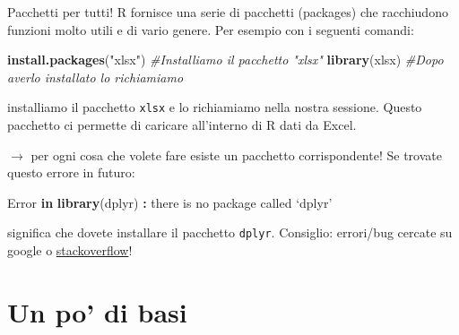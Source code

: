 \documentclass[
  ignorenonframetext,
]{beamer}
\newenvironment{Shaded}{\begin{snugshade}}{\end{snugshade}}
\newcommand{\CommentTok}[1]{\textcolor[rgb]{0.56,0.35,0.01}{\textit{#1}}}
\newcommand{\ControlFlowTok}[1]{\textcolor[rgb]{0.13,0.29,0.53}{\textbf{#1}}}
\newcommand{\KeywordTok}[1]{\textcolor[rgb]{0.13,0.29,0.53}{\textbf{#1}}}
\newcommand{\NormalTok}[1]{#1}
\newcommand{\OperatorTok}[1]{\textcolor[rgb]{0.81,0.36,0.00}{\textbf{#1}}}
\newcommand{\StringTok}[1]{\textcolor[rgb]{0.31,0.60,0.02}{#1}}
\begin{document}
\begin{frame}[fragile]{Pacchetti per tutti!}
\protect\hypertarget{pacchetti-per-tutti}{}
R fornisce una serie di pacchetti (packages) che racchiudono funzioni
molto utili e di vario genere. Per esempio con i seguenti comandi:

\begin{Shaded}
\begin{Highlighting}[]
\KeywordTok{install.packages}\NormalTok{(}\StringTok{"xlsx"}\NormalTok{) }\CommentTok{\#Installiamo il pacchetto "xlsx"}
\KeywordTok{library}\NormalTok{(xlsx) }\CommentTok{\#Dopo averlo installato lo richiamiamo }
\end{Highlighting}
\end{Shaded}

installiamo il pacchetto \texttt{xlsx} e lo richiamiamo nella nostra
sessione. Questo pacchetto ci permette di caricare all'interno di R dati
da Excel.

\(\rightarrow\) per ogni cosa che volete fare esiste un pacchetto
corrispondente! Se trovate questo errore in futuro:

\begin{Shaded}
\begin{Highlighting}[]
\NormalTok{Error }\ControlFlowTok{in} \KeywordTok{library}\NormalTok{(dplyr) }\OperatorTok{:}\StringTok{ }\NormalTok{there is no package called ‘dplyr’}
\end{Highlighting}
\end{Shaded}

significa che dovete installare il pacchetto \texttt{dplyr}. Consiglio:
errori/bug cercate su google o
\href{https://stackoverflow.com}{stackoverflow}!
\end{frame}

\hypertarget{un-po-di-basi}{%
\section{Un po' di basi}\label{un-po-di-basi}}
\end{document}
